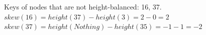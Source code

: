 \documentclass[12pt,twoside]{article}
\begin{document}


\begin{problems}

\problem  %

\begin{problemparts}
\problempart %
Keys of nodes that are not height-balanced: 16, 37. \\
$skew(16) = height(37) - height(3) = 2 - 0 = 2$ \\
$skew(37) = height(Nothing) - height(35) = -1 - 1 = -2$

\problempart %
\\
\begin{itemize}


\end{itemize}
\end{problemparts}
\end{problems}
\end{document}

